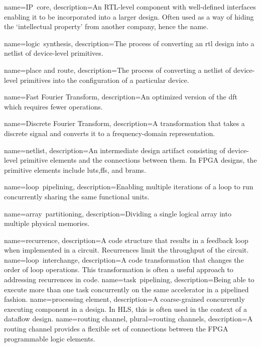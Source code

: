 {
	name={IP~core},
	description={An RTL-level component with well-defined interfaces enabling it to be incorporated into a larger design.  Often used as a way of hiding the `intellectual property' from another company, hence the name.}
} 

{
	name={logic~synthesis},
	description={The process of converting an \gls{rtl} design into a netlist of device-level primitives.}
}

{
	name={place and route},
	description={The process of converting a netlist of device-level primitives into the configuration of a particular device.}
} 

{
	name={Fast Fourier Transform},
    	description={An optimized version of the \gls{dft} which requires fewer operations.}
}

{
	name={Discrete Fourier Transform},
    	description={A transformation that takes a discrete signal and converts it to a frequency-domain representation.}
}

{
	name={netlist},
	description={An intermediate design artifact consisting of device-level primitive elements and the connections between them.  In FPGA designs, the primitive elements include \glspl{lut},\glspl{ff}, and \glspl{bram}.}
} 

{
	name={loop~pipelining},
	description={Enabling multiple iterations of a loop to run concurrently sharing the same functional units.}
} 

{
	name={array~partitioning},
	description={Dividing a single logical array into multiple physical memories.}
} 

{
	name={recurrence},
	description={A code structure that results in a feedback loop when implemented in a circuit.  Recurrences limit the throughput of the circuit.}
} 
{
	name={loop~interchange},
	description={A code transformation that changes the order of loop operations.   This transformation is often a useful approach to addressing recurrences in code.}
} 
{
	name={task~pipelining},
	description={Being able to execute more than one task concurrently on the same accelerator in a pipelined fashion.}
} 
{
	name={processing element},
	description={A coarse-grained concurrently executing component in a design.  In HLS, this is often used in the context of a dataflow design.}
} 
{
	name={routing channel},
	plural={routing channels},
	description={A routing channel provides a flexible set of connections between the FPGA programmable logic elements. }
}


